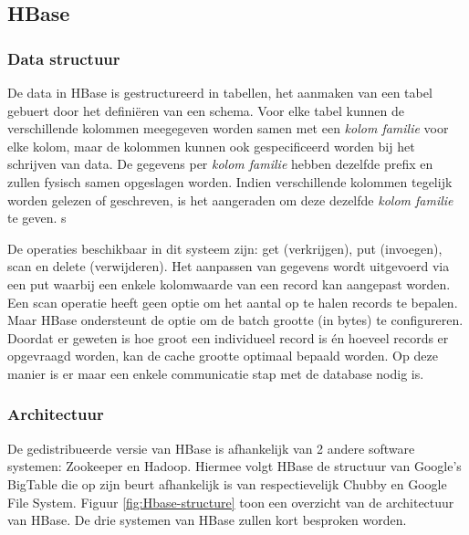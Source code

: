 \subsection{HBase}

\subsubsection{Data structuur\cite{george2011hbase}}
De data in HBase is gestructureerd in tabellen, het aanmaken van een tabel gebuert door het definiëren van een schema. Voor elke tabel kunnen de verschillende kolommen meegegeven worden samen met een \textit{kolom familie} voor elke kolom, maar de kolommen kunnen ook gespecificeerd worden bij het schrijven van data. De gegevens per \textit{kolom familie} hebben dezelfde prefix en zullen fysisch samen opgeslagen worden. Indien verschillende kolommen tegelijk worden gelezen of geschreven, is het aangeraden om deze dezelfde \textit{kolom familie} te geven. s

De operaties beschikbaar in dit systeem zijn: get (verkrijgen), put (invoegen), scan en delete (verwijderen). Het aanpassen van gegevens wordt uitgevoerd via een put waarbij een enkele kolomwaarde van een record kan aangepast worden. Een scan operatie heeft geen optie om het aantal op te halen records te bepalen. Maar HBase ondersteunt de optie om de batch grootte (in bytes) te configureren. Doordat er geweten is hoe groot een individueel record is én hoeveel records er opgevraagd worden, kan de cache grootte optimaal bepaald worden. Op deze manier is er maar een enkele communicatie stap met de database nodig is. 

\subsubsection{Architectuur\cite{george2011hbase}}
De gedistribueerde versie van HBase is afhankelijk van 2 andere software systemen: Zookeeper\cite{hunt2010zookeeper} en Hadoop\cite{borthakur2007hadoop}. Hiermee volgt HBase de structuur van Google's BigTable\cite{chang2008bigtable} die op zijn beurt afhankelijk is van respectievelijk Chubby\cite{burrows2006chubby} en Google File System\cite{ghemawat2003google}. Figuur \ref{fig:Hbase-structure} toon een overzicht van de architectuur van HBase. De drie systemen van HBase zullen kort besproken worden. 

